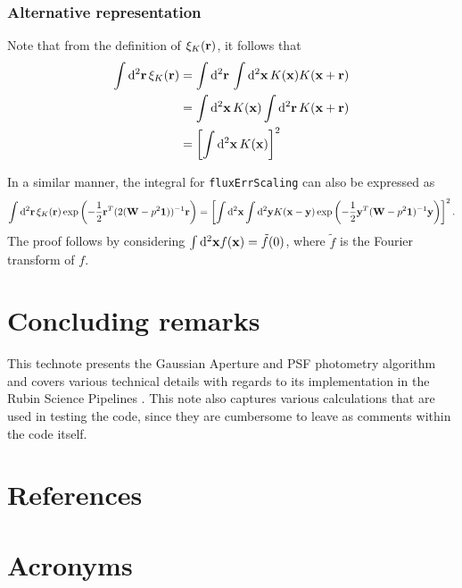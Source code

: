 \documentclass[DM,lsstdraft, authoryear,toc]{lsstdoc}
\newcommand{\rmd}{\mathrm{d}^2}
\begin{document}
\subsubsection{Alternative representation}
Note that from the definition of $\xi_K({\bf r})$, it follows that
\begin{align}
  \int\rmd{\bf r}\, \xi_K({\bf r}) &= \int\rmd{\bf r}\, \int\rmd{\bf x}\, K({\bf x})K({\bf x}+{\bf r})\\
                                   &= \int\rmd{\bf x}\, K({\bf x}) \int\rmd{\bf r}\, K({\bf x}+{\bf r})\\
                                   &= \left[ \int\rmd{\bf x}\, K({\bf x})\right]^2
                                   \label{eq:integral_acf}
\end{align}

In a similar manner, the integral for \texttt{fluxErrScaling} can also be expressed as
\begin{equation}
  \int\rmd {\bf r}\, \xi_{K}({\bf r}) \exp\left(-\frac{1}{2}{\bf r}^T(2({\bf W}-p^2{\bf 1}))^{-1}{\bf r}\right) =
  \left[ \int\rmd{\bf x}\int\rmd{\bf y} K({\bf x}-{\bf y}) \exp\left(-\frac{1}{2}{\bf y}^T({\bf W}-p^2{\bf 1})^{-1}{\bf y}\right)\right]^2.
\end{equation}
The proof follows by considering $\int\rmd{\bf x} f({\bf x}) = \tilde{f}(0)$, where $\tilde{f}$ is the Fourier transform of $f$.

\section{Concluding remarks}
This technote presents the Gaussian Aperture and PSF photometry algorithm and covers various technical details with regards to its implementation in the Rubin Science Pipelines .
This note also captures various calculations that are used in testing the code, since they are cumbersome to leave as comments within the code itself.

\appendix
\section{References} \label{sec:bib}
\renewcommand{\refname}{} %


\section{Acronyms} \label{sec:acronyms}

\end{document}
